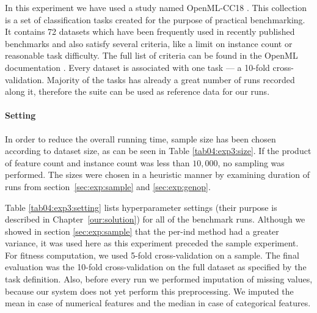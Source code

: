 In this experiment we have used a study named OpenML-CC18 \citep{openmlcc18}.
This collection is a set of classification tasks created for the purpose
of practical benchmarking. It contains 72 datasets which have been frequently
used in recently published benchmarks and also satisfy several criteria, like
a limit on instance count or reasonable task difficulty. The full list of
criteria can be found in the OpenML documentation \citep{openmlcc18docs}.
Every dataset is associated with one task --- a 10-fold cross-validation. 
Majority of the tasks has already a great number of runs recorded along it,
therefore the suite can be used as reference data for our runs.

\paragraph{Setting}
In order to reduce the overall running time, sample size has been chosen
according to dataset size, as can be seen in Table \ref{tab04:exp3:size}.
If the product of feature count and instance count was less than $10,000$,
no sampling was performed.
The sizes were chosen in a heuristic manner by examining duration of runs
from section~\ref{sec:exp:sample} and \ref{sec:exp:genop}.

Table \ref{tab04:exp3:setting} lists hyperparameter settings (their purpose
is described in Chapter~\ref{our:solution}) for all of the
benchmark runs. Although we showed in section \ref{sec:exp:sample}
that the per-ind method had a greater variance, it was used here as this
experiment preceded the sample experiment. For fitness computation, we used
5-fold cross-validation on a sample. The final evaluation was the 10-fold
cross-validation on the full dataset as specified by the task definition.
Also, before every run we performed imputation of missing values, because our system
does not yet perform this preprocessing. We imputed the mean in case of numerical
features and the median in case of categorical features.

